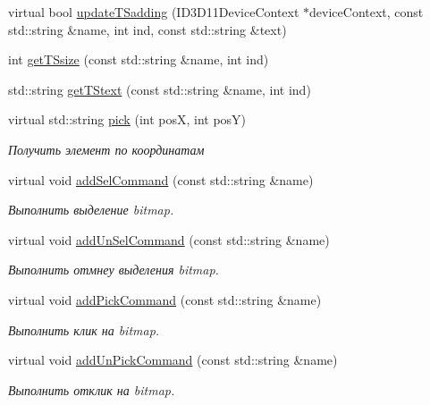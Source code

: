 \begin{DoxyCompactItemize}
\item 
virtual bool \hyperlink{class_interface_element_class_ae505d58cae330457c8b5bbdd23bb644f}{update\+T\+Sadding} (I\+D3\+D11\+Device\+Context $\ast$device\+Context, const std\+::string \&name, int ind, const std\+::string \&text)
\item 
int \hyperlink{class_interface_element_class_ac7b96d7196906f80b377e293cc36404c}{get\+T\+Ssize} (const std\+::string \&name, int ind)
\item 
std\+::string \hyperlink{class_interface_element_class_aef459140ce6fc4cfcf0b6fd017e73617}{get\+T\+Stext} (const std\+::string \&name, int ind)
\item 
virtual std\+::string \hyperlink{class_interface_element_class_a6dbf6a318a5e4b60b58a7652d2e54b0a}{pick} (int posX, int posY)
\begin{DoxyCompactList}\small\item\em Получить элемент по координатам \end{DoxyCompactList}\item 
virtual void \hyperlink{class_interface_element_class_a47b6374245f1b3a2c56366b8819f1569}{add\+Sel\+Command} (const std\+::string \&name)
\begin{DoxyCompactList}\small\item\em Выполнить выделение bitmap. \end{DoxyCompactList}\item 
virtual void \hyperlink{class_interface_element_class_a906729d7cf4a4db85520c8e516007685}{add\+Un\+Sel\+Command} (const std\+::string \&name)
\begin{DoxyCompactList}\small\item\em Выполнить отмнеу выделения bitmap. \end{DoxyCompactList}\item 
virtual void \hyperlink{class_interface_element_class_af1061f10847c0c30a5815e64892e8d60}{add\+Pick\+Command} (const std\+::string \&name)
\begin{DoxyCompactList}\small\item\em Выполнить клик на bitmap. \end{DoxyCompactList}\item 
virtual void \hyperlink{class_interface_element_class_a318c70a834096462e9ed764f32fe3065}{add\+Un\+Pick\+Command} (const std\+::string \&name)
\begin{DoxyCompactList}\small\item\em Выполнить отклик на bitmap. \end{DoxyCompactList}\item 

\end{DoxyCompactItemize}
